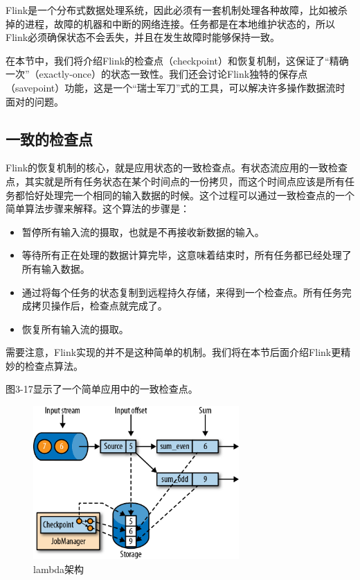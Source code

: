 \documentclass[cn,11pt,chinese]{elegantbook}
\begin{document}
Flink是一个分布式数据处理系统，因此必须有一套机制处理各种故障，比如被杀掉的进程，故障的机器和中断的网络连接。任务都是在本地维护状态的，所以Flink必须确保状态不会丢失，并且在发生故障时能够保持一致。

在本节中，我们将介绍Flink的检查点（checkpoint）和恢复机制，这保证了“精确一次”（exactly-once）的状态一致性。我们还会讨论Flink独特的保存点（savepoint）功能，这是一个“瑞士军刀”式的工具，可以解决许多操作数据流时面对的问题。

\subsection{一致的检查点}

Flink的恢复机制的核心，就是应用状态的一致检查点。有状态流应用的一致检查点，其实就是所有任务状态在某个时间点的一份拷贝，而这个时间点应该是所有任务都恰好处理完一个相同的输入数据的时候。这个过程可以通过一致检查点的一个简单算法步骤来解释。这个算法的步骤是：

\begin{itemize}
\item 暂停所有输入流的摄取，也就是不再接收新数据的输入。
\item 等待所有正在处理的数据计算完毕，这意味着结束时，所有任务都已经处理了所有输入数据。
\item 通过将每个任务的状态复制到远程持久存储，来得到一个检查点。所有任务完成拷贝操作后，检查点就完成了。
\item 恢复所有输入流的摄取。
\end{itemize}

需要注意，Flink实现的并不是这种简单的机制。我们将在本节后面介绍Flink更精妙的检查点算法。

图3-17显示了一个简单应用中的一致检查点。

\begin{figure}[htbp]
    \centering
    \includegraphics[width=0.7\textwidth]{images/spaf_0317.png}
    \caption{lambda架构}
\end{figure}
\end{document}
